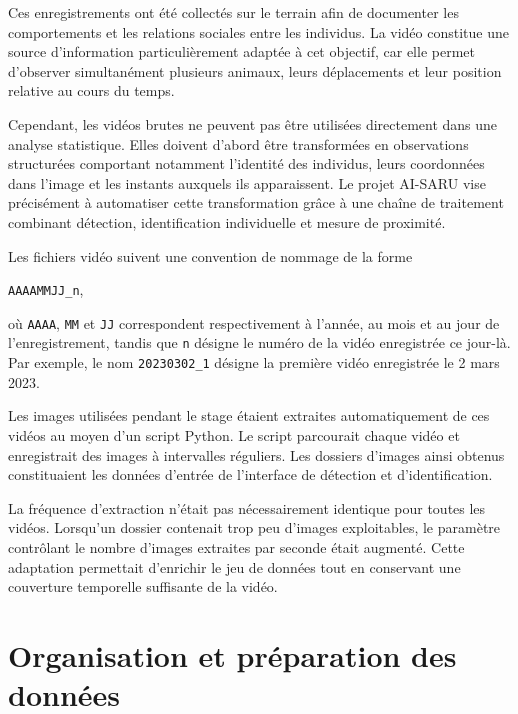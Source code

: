 \documentclass[11pt,a4paper]{report}
\begin{document}
Ces enregistrements ont été collectés sur le terrain afin de documenter les
comportements et les relations sociales entre les individus. La vidéo constitue
une source d'information particulièrement adaptée à cet objectif, car elle
permet d'observer simultanément plusieurs animaux, leurs déplacements et leur
position relative au cours du temps.

Cependant, les vidéos brutes ne peuvent pas être utilisées directement dans
une analyse statistique. Elles doivent d'abord être transformées en
observations structurées comportant notamment l'identité des individus, leurs
coordonnées dans l'image et les instants auxquels ils apparaissent. Le projet
AI-SARU vise précisément à automatiser cette transformation grâce à une chaîne
de traitement combinant détection, identification individuelle et mesure de
proximité.

Les fichiers vidéo suivent une convention de nommage de la forme

\begin{center}
    \texttt{AAAAMMJJ\_n},
\end{center}

où \texttt{AAAA}, \texttt{MM} et \texttt{JJ} correspondent respectivement à
l'année, au mois et au jour de l'enregistrement, tandis que \texttt{n} désigne
le numéro de la vidéo enregistrée ce jour-là. Par exemple, le nom
\texttt{20230302\_1} désigne la première vidéo enregistrée le 2 mars 2023.

Les images utilisées pendant le stage étaient extraites automatiquement de ces
vidéos au moyen d'un script Python. Le script parcourait chaque vidéo et
enregistrait des images à intervalles réguliers. Les dossiers d'images ainsi
obtenus constituaient les données d'entrée de l'interface de détection et
d'identification.

La fréquence d'extraction n'était pas nécessairement identique pour toutes les
vidéos. Lorsqu'un dossier contenait trop peu d'images exploitables, le paramètre
contrôlant le nombre d'images extraites par seconde était augmenté. Cette
adaptation permettait d'enrichir le jeu de données tout en conservant une
couverture temporelle suffisante de la vidéo.

\section{Organisation et préparation des données}
\end{document}
